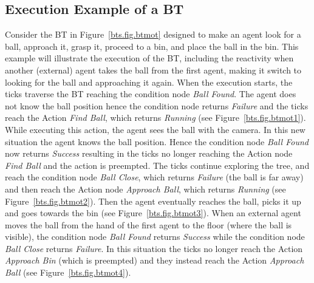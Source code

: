 


\subsection{Execution Example of a BT}
\label{bts.ee}
Consider the BT in Figure~\ref{bts.fig.btmot} 
designed to make an agent look for a ball, approach it, grasp it, proceed to a bin, and place the ball in the bin.
This example will illustrate the execution of the BT, including the reactivity when another (external) agent takes the ball from the first agent, 
making it switch to looking for the ball and approaching it again.
When the execution starts, the ticks traverse the BT reaching the condition node \emph{Ball Found}. The agent does not know the ball position hence the condition node returns  \emph{Failure} and the ticks reach the Action \emph{Find Ball}, which returns  \emph{Running} (see Figure~\ref{bts.fig.btmot1}). While executing this action, the agent  sees the ball with the camera.  In this new situation the agent knows the ball position. Hence the condition node \emph{Ball Found} now returns  \emph{Success} resulting in the ticks no longer reaching the Action node \emph{Find Ball} and the action is preempted. The ticks continue exploring the tree, and reach the condition node \emph{Ball Close}, which returns \emph{Failure} (the ball is far away) and then reach the Action node \emph{Approach Ball}, which returns  \emph{Running} (see Figure~\ref{bts.fig.btmot2}). Then the agent eventually reaches the ball, picks it up and goes towards the bin (see Figure~\ref{bts.fig.btmot3}). When an external agent moves the ball from the hand of the first agent to the floor (where the ball is visible), the condition node \emph{Ball Found} returns  \emph{Success} while the condition node \emph{Ball Close} returns  \emph{Failure}. In this situation the ticks no longer reach the Action \emph{Approach Bin} (which is preempted) and they instead reach the Action \emph{Approach Ball} (see Figure~\ref{bts.fig.btmot4}).  



